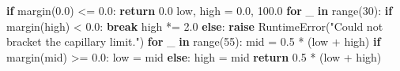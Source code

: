 \documentclass[
  12pt,
  12pt,a4paper,oneside]{report}
\newenvironment{Shaded}{}{}
\newcommand{\BuiltInTok}[1]{\textcolor[rgb]{0.00,0.50,0.00}{#1}}
\newcommand{\ControlFlowTok}[1]{\textcolor[rgb]{0.00,0.44,0.13}{\textbf{#1}}}
\newcommand{\DecValTok}[1]{\textcolor[rgb]{0.25,0.63,0.44}{#1}}
\newcommand{\FloatTok}[1]{\textcolor[rgb]{0.25,0.63,0.44}{#1}}
\newcommand{\KeywordTok}[1]{\textcolor[rgb]{0.00,0.44,0.13}{\textbf{#1}}}
\newcommand{\NormalTok}[1]{#1}
\newcommand{\OperatorTok}[1]{\textcolor[rgb]{0.40,0.40,0.40}{#1}}
\newcommand{\PreprocessorTok}[1]{\textcolor[rgb]{0.74,0.48,0.00}{#1}}
\newcommand{\StringTok}[1]{\textcolor[rgb]{0.25,0.44,0.63}{#1}}
\begin{document}
\begin{Shaded}
\begin{Highlighting}[]
    \ControlFlowTok{if}\NormalTok{ margin(}\FloatTok{0.0}\NormalTok{) }\OperatorTok{\textless{}=} \FloatTok{0.0}\NormalTok{:}
        \ControlFlowTok{return} \FloatTok{0.0}
\NormalTok{    low, high }\OperatorTok{=} \FloatTok{0.0}\NormalTok{, }\FloatTok{100.0}
    \ControlFlowTok{for}\NormalTok{ \_ }\KeywordTok{in} \BuiltInTok{range}\NormalTok{(}\DecValTok{30}\NormalTok{):}
        \ControlFlowTok{if}\NormalTok{ margin(high) }\OperatorTok{\textless{}} \FloatTok{0.0}\NormalTok{:}
            \ControlFlowTok{break}
\NormalTok{        high }\OperatorTok{*=} \FloatTok{2.0}
    \ControlFlowTok{else}\NormalTok{:}
        \ControlFlowTok{raise} \PreprocessorTok{RuntimeError}\NormalTok{(}\StringTok{"Could not bracket the capillary limit."}\NormalTok{)}
    \ControlFlowTok{for}\NormalTok{ \_ }\KeywordTok{in} \BuiltInTok{range}\NormalTok{(}\DecValTok{55}\NormalTok{):}
\NormalTok{        mid }\OperatorTok{=} \FloatTok{0.5} \OperatorTok{*}\NormalTok{ (low }\OperatorTok{+}\NormalTok{ high)}
        \ControlFlowTok{if}\NormalTok{ margin(mid) }\OperatorTok{\textgreater{}=} \FloatTok{0.0}\NormalTok{:}
\NormalTok{            low }\OperatorTok{=}\NormalTok{ mid}
        \ControlFlowTok{else}\NormalTok{:}
\NormalTok{            high }\OperatorTok{=}\NormalTok{ mid}
    \ControlFlowTok{return} \FloatTok{0.5} \OperatorTok{*}\NormalTok{ (low }\OperatorTok{+}\NormalTok{ high)}



\end{Highlighting}
\end{Shaded}
\end{document}
